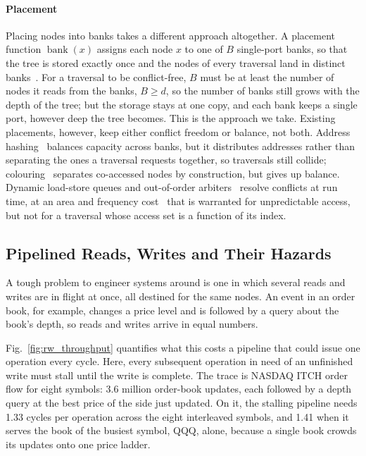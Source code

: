 \paragraph{Placement} Placing nodes into banks takes a different approach
altogether. A placement function $\operatorname{bank}(x)$ assigns each node $x$
to one of $B$ single-port banks, so that the tree is stored exactly once and
the nodes of every traversal land in distinct
banks~\cite{das2000mappings,zhou2017new}. For
a traversal to be conflict-free, $B$ must be at least the number of nodes it
reads from the banks, $B \ge d$, so the number of banks still grows with the
depth of the tree; but the storage stays at one copy, and each bank keeps a
single port, however deep the tree becomes. This is the approach we take.
Existing placements, however, keep either conflict freedom or balance, not both. Address
hashing~\cite{rau1991pseudorandomly,vandenbraak2016configurable} balances
capacity across banks, but it distributes addresses rather than separating the
ones a traversal requests together, so traversals still collide;
colouring~\cite{das2000mappings} separates co-accessed nodes by construction,
but gives up balance. Dynamic load-store queues and out-of-order
arbiters~\cite{josipovic2017outoforder} resolve conflicts at run time, at an
area and frequency cost~\cite{szafarczyk2023compiler} that is warranted for
unpredictable access, but not for a traversal whose access set is a function of
its index.


\subsection{Pipelined Reads, Writes and Their Hazards}\label{sec:mot_rw}

A tough problem to engineer systems around is one in which several reads and
writes are in flight at once, all destined for the same nodes. An event in an
order book, for example, changes a price level and is followed by a query about
the book's depth, so reads and writes arrive in equal numbers.

Fig.~\ref{fig:rw_throughput} quantifies what this costs a pipeline that could
issue one operation every cycle. Here, every subsequent operation in need of an
unfinished write must stall until the write is complete. The trace is NASDAQ
ITCH order flow for eight symbols: 3.6 million order-book updates, each
followed by a depth query at the best price of the side just updated. On it,
the stalling pipeline needs 1.33 cycles per operation across the eight
interleaved symbols, and 1.41 when it serves the book of the busiest symbol,
QQQ, alone, because a single book crowds its updates onto one price ladder.

